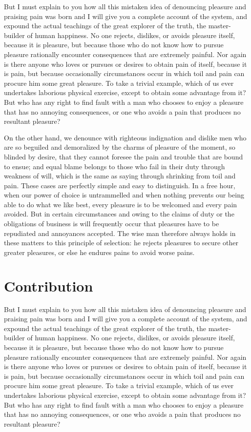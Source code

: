 But I must explain to you how all this mistaken idea of denouncing pleasure and praising pain was born and I will give you a complete account of the system, and expound the actual teachings of the great explorer of the truth, the master-builder of human happiness. No one rejects, dislikes, or avoids pleasure itself, because it is pleasure, but because those who do not know how to pursue pleasure rationally encounter consequences that are extremely painful. Nor again is there anyone who loves or pursues or desires to obtain pain of itself, because it is pain, but because occasionally circumstances occur in which toil and pain can procure him some great pleasure. To take a trivial example, which of us ever undertakes laborious physical exercise, except to obtain some advantage from it? But who has any right to find fault with a man who chooses to enjoy a pleasure that has no annoying consequences, or one who avoids a pain that produces no resultant pleasure?

On the other hand, we denounce with righteous indignation and dislike men who are so beguiled and demoralized by the charms of pleasure of the moment, so blinded by desire, that they cannot foresee the pain and trouble that are bound to ensue; and equal blame belongs to those who fail in their duty through weakness of will, which is the same as saying through shrinking from toil and pain. These cases are perfectly simple and easy to distinguish. In a free hour, when our power of choice is untrammelled and when nothing prevents our being able to do what we like best, every pleasure is to be welcomed and every pain avoided. But in certain circumstances and owing to the claims of duty or the obligations of business is will frequently occur that pleasures have to be repudiated and annoyances accepted. The wise man therefore always holds in these matters to this principle of selection: he rejects pleasures to secure other greater pleasures, or else he endures pains to avoid worse pains. 

\section{Contribution}

But I must explain to you how all this mistaken idea of denouncing pleasure and praising pain was born and I will give you a complete account of the system, and expound the actual teachings of the great explorer of the truth, the master-builder of human happiness. No one rejects, dislikes, or avoids pleasure itself, because it is pleasure, but because those who do not know how to pursue pleasure rationally encounter consequences that are extremely painful. Nor again is there anyone who loves or pursues or desires to obtain pain of itself, because it is pain, but because occasionally circumstances occur in which toil and pain can procure him some great pleasure. To take a trivial example, which of us ever undertakes laborious physical exercise, except to obtain some advantage from it? But who has any right to find fault with a man who chooses to enjoy a pleasure that has no annoying consequences, or one who avoids a pain that produces no resultant pleasure?


